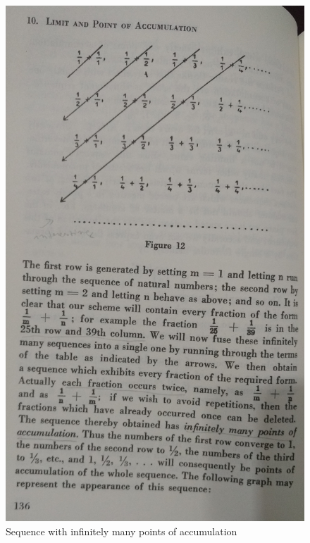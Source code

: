 \documentclass{cornell}
\begin{document}
\begin{figure}[!t]
\centering
\includegraphics[width=1.0\linewidth]{images/fig002.jpg}
\caption{Sequence with infinitely many points of accumulation }
\label{fig02}
\end{figure}
\end{document}

